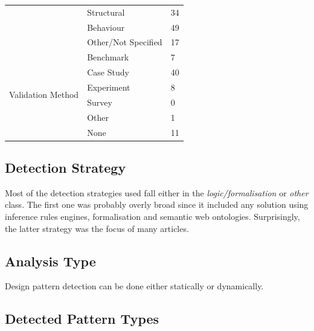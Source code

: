 \documentclass[letterpaper, 10 pt, conference]{ieeeconf}  %
\begin{document}
\begin{center}
\begin{tabular}{ lll }
    & \multicolumn{1}{l}{Structural}   & \multicolumn{1}{l}{34} \\
    & \multicolumn{1}{l}{Behaviour}    & \multicolumn{1}{l}{49} \\
    & \multicolumn{1}{l}{Other/Not Specified}
                                       & \multicolumn{1}{l}{17} \\
    \hline
    \multirow{6}{*}{Validation Method}
    & \multicolumn{1}{l}{Benchmark}    & \multicolumn{1}{l}{7} \\
    & \multicolumn{1}{l}{Case Study}   & \multicolumn{1}{l}{40} \\
    & \multicolumn{1}{l}{Experiment}   & \multicolumn{1}{l}{8} \\
    & \multicolumn{1}{l}{Survey}       & \multicolumn{1}{l}{0} \\
    & \multicolumn{1}{l}{Other}        & \multicolumn{1}{l}{1} \\
    & \multicolumn{1}{l}{None}         & \multicolumn{1}{l}{11}
  \end{tabular}
\end{center}

\subsection{Detection Strategy}

Most of the detection strategies used fall either in the 
\textit{logic/formalisation} or \textit{other} class.
The first one was probably overly broad since it included any solution using
inference rules engines, formalisation and semantic web ontologies.
Surprisingly, the latter strategy was the focus of many articles. 




\subsection{Analysis Type}

Design pattern detection can be done either statically or dynamically.





\subsection{Detected Pattern Types}
\end{document}
